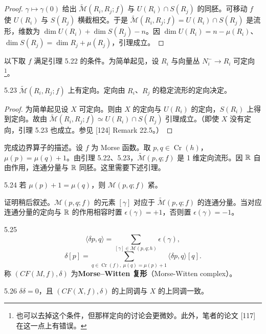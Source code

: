 \begin{proof}
  $\gamma\mapsto\gamma(0)$ 给出 $\tilde{\mathcal{M}}(R_i,R_j;f)$ 与 $U(R_i)\cap S(R_j)$ 的同胚。可移动 $f$ 使 $U(R_i)$ 与 $S(R_j)$ 横截相交。于是
  $\tilde{\mathcal{M}}(R_i,R_j;f)=U(R_i)\cap S(R_j)$ 是流形，维数为 $\dim U(R_i)+\dim S(R_j)-n$。因 $\dim U(R_i)=n-\mu(R_i)$、$\dim S(R_j)=\dim R_j+\mu(R_j)$，引理成立。
\end{proof}

以下取 $f$ 满足引理 5.22 的条件。为简单起见，设 $R_i$ 与向量丛 $N_i^{-}\to R_i$ 可定向\footnote{也可以去掉这个条件，但那样定向的讨论会更微妙。此外，笔者的论文 [117] 在这一点上有错误。}。

\begin{lemma*}{5.23}
  $\tilde{\mathcal{M}}(R_i,R_j;f)$ 上有定向。定向由 $R_i$、$R_j$ 的稳定流形的定向决定。
\end{lemma*}

\begin{proof}
  为简单起见设 $X$ 可定向。则由 $X$ 的定向与 $U(R_i)$ 的定向，$S(R_i)$ 上得到定向。故由 $\tilde{\mathcal{M}}(R_i,R_j;f)\simeq U(R_i)\cap S(R_j)$ 引理成立。（即使 $X$ 没有定向，引理 5.23 也成立。参见 [124] Remark 22.5。）
\end{proof}

完成边界算子的描述。设 $f$ 为 Morse 函数。取 $p,q\in\operatorname{Cr}(h)$，$\mu(p)=\mu(q)+1$。由引理 5.22、5.23，$\tilde{\mathcal{M}}(p,q;f)$ 是 1 维定向流形。因 $\mathbb{R}$ 自由作用，连通分量与 $\mathbb{R}$ 同胚。这里需要下述引理。

\begin{lemma}{5.24}
  若 $\mu(p)+1=\mu(q)$，则 $\mathcal{M}(p,q;f)$ 紧。
\end{lemma}

证明稍后叙述。$\mathcal{M}(p,q;f)$ 的元素 $[\gamma]$ 对应于 $\tilde{\mathcal{M}}(p,q;f)$ 的连通分量。当对应连通分量的定向与 $\mathbb{R}$ 的作用相容时置 $\epsilon(\gamma)=+1$，否则置 $\epsilon(\gamma)=-1$。

\begin{definition}{5.25}
  \[
    \langle\delta p,q\rangle=\sum_{[\gamma]\in\mathcal{M}(p,q;h)}\epsilon(\gamma),
  \]
  \[
    \delta[p]=\sum_{q\in\operatorname{Cr}(f),\ \mu(q)=\mu(p)+1}\langle\delta p,q\rangle[q].
  \]
  称 $(CF(M,f),\delta)$ 为\textbf{Morse–Witten 复形}（Morse-Witten complex）。
\end{definition}

\begin{theorem}{5.26}
  $\delta\delta=0$，且 $(CF(X,f),\delta)$ 的上同调与 $X$ 的上同调一致。
\end{theorem}

